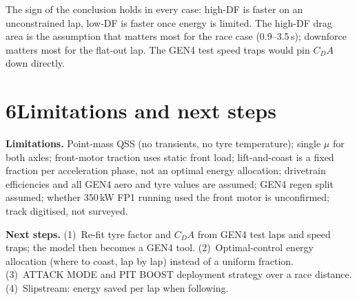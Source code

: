 \documentclass[10pt,a4paper]{article}
\begin{document}
The sign of the conclusion holds in every case: high-DF is faster on an unconstrained lap,
low-DF is faster once energy is limited. The high-DF drag area is the assumption that matters
most for the race case (0.9--3.5\,s); downforce matters most for the flat-out lap.
The GEN4 test speed traps would pin $C_DA$ down directly.

\section*{6\quad Limitations and next steps}

\textbf{Limitations.} Point-mass QSS (no transients, no tyre temperature); single $\mu$ for both
axles; front-motor traction uses static front load; lift-and-coast is a fixed fraction per
acceleration phase, not an optimal energy allocation; drivetrain efficiencies and all GEN4 aero
and tyre values are assumed; GEN4 regen split assumed; whether 350\,kW FP1 running used the
front motor is unconfirmed; track digitised, not surveyed.

\textbf{Next steps.}
(1)~Re-fit tyre factor and $C_DA$ from GEN4 test laps and speed traps; the model then becomes a
GEN4 tool.
(2)~Optimal-control energy allocation (where to coast, lap by lap) instead of a uniform fraction.
(3)~ATTACK MODE and PIT BOOST deployment strategy over a race distance.
(4)~Slipstream: energy saved per lap when following.
\end{document}
